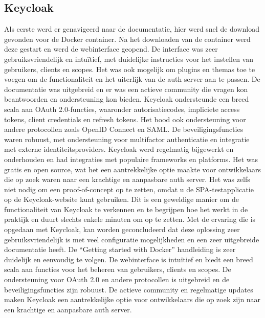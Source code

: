 \subsection{Keycloak}%
\label{subsubsec:keycloak}
Als eerste werd er genavigeerd naar de documentatie, hier werd snel de download gevonden voor de Docker container. Na het downloaden van de container werd deze gestart en werd de webinterface geopend. De interface was zeer gebruiksvriendelijk en intuïtief, met duidelijke instructies voor het instellen van gebruikers, clients en scopes. Het was ook mogelijk om plugins en themas toe te voegen om de functionaliteit en het uiterlijk van de auth server aan te passen. De documentatie was uitgebreid en er was een actieve community die vragen kon beantwoorden en ondersteuning kon bieden. Keycloak ondersteunde een breed scala aan OAuth 2.0-functies, waaronder autorisatiecodes, impliciete access tokens, client credentials en refresh tokens. Het bood ook ondersteuning voor andere protocollen zoals OpenID Connect en SAML. De beveiligingsfuncties waren robuust, met ondersteuning voor multifactor authenticatie en integratie met externe identiteitsproviders. Keycloak werd regelmatig bijgewerkt en onderhouden en had integraties met populaire frameworks en platforms. Het was gratis en open source, wat het een aantrekkelijke optie maakte voor ontwikkelaars die op zoek waren naar een krachtige en aanpasbare auth server.
Het was zelfs niet nodig om een proof-of-concept op te zetten, omdat u de SPA-testapplicatie op de Keycloak-website kunt gebruiken. Dit is een geweldige manier om de functionaliteit van Keycloak te verkennen en te begrijpen hoe het werkt in de praktijk en duurt slechts enkele minuten om op te zetten.
Met de ervaring die is opgedaan met Keycloak, kan worden geconcludeerd dat deze oplossing zeer gebruiksvriendelijk is met veel configuratie mogelijkheden en een zeer uitgebreide documentatie heeft. De ``Getting started with Docker'' handleiding is zeer duidelijk en eenvoudig te volgen. De webinterface is intuïtief en biedt een breed scala aan functies voor het beheren van gebruikers, clients en scopes. De ondersteuning voor OAuth 2.0 en andere protocollen is uitgebreid en de beveiligingsfuncties zijn robuust. De actieve community en regelmatige updates maken Keycloak een aantrekkelijke optie voor ontwikkelaars die op zoek zijn naar een krachtige en aanpasbare auth server.

